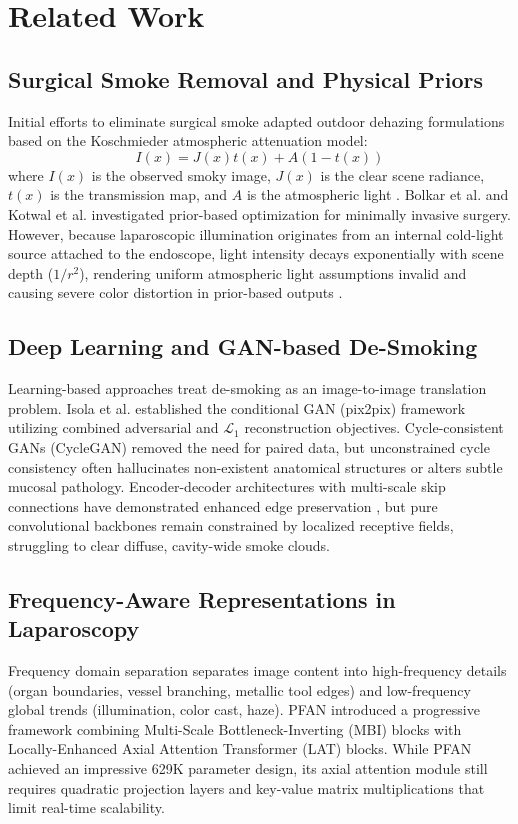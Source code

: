 \documentclass[conference]{IEEEtran}
\begin{document}
\section{Related Work}
\subsection{Surgical Smoke Removal and Physical Priors}
Initial efforts to eliminate surgical smoke adapted outdoor dehazing formulations based on the Koschmieder atmospheric attenuation model:
\begin{equation}
I(x) = J(x)t(x) + A(1 - t(x))
\end{equation}
where $I(x)$ is the observed smoky image, $J(x)$ is the clear scene radiance, $t(x)$ is the transmission map, and $A$ is the atmospheric light \cite{he2011}. Bolkar et al. \cite{bolkar2018} and Kotwal et al. \cite{kotwal2016} investigated prior-based optimization for minimally invasive surgery. However, because laparoscopic illumination originates from an internal cold-light source attached to the endoscope, light intensity decays exponentially with scene depth ($1/r^2$), rendering uniform atmospheric light assumptions invalid and causing severe color distortion in prior-based outputs \cite{chen2022}.

\subsection{Deep Learning and GAN-based De-Smoking}
Learning-based approaches treat de-smoking as an image-to-image translation problem. Isola et al. \cite{isola2017} established the conditional GAN (pix2pix) framework utilizing combined adversarial and $\mathcal{L}_1$ reconstruction objectives. Cycle-consistent GANs (CycleGAN) \cite{zhu2017} removed the need for paired data, but unconstrained cycle consistency often hallucinates non-existent anatomical structures or alters subtle mucosal pathology. Encoder-decoder architectures with multi-scale skip connections have demonstrated enhanced edge preservation \cite{deng2019}, but pure convolutional backbones remain constrained by localized receptive fields, struggling to clear diffuse, cavity-wide smoke clouds.

\subsection{Frequency-Aware Representations in Laparoscopy}
Frequency domain separation separates image content into high-frequency details (organ boundaries, vessel branching, metallic tool edges) and low-frequency global trends (illumination, color cast, haze). PFAN \cite{pfan2024} introduced a progressive framework combining Multi-Scale Bottleneck-Inverting (MBI) blocks with Locally-Enhanced Axial Attention Transformer (LAT) blocks. While PFAN achieved an impressive 629K parameter design, its axial attention module still requires quadratic projection layers and key-value matrix multiplications that limit real-time scalability.
\end{document}
